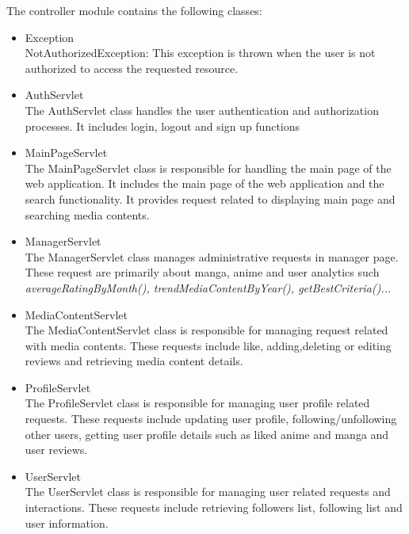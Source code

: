 The controller module contains the following classes:
\begin{itemize}
    \item Exception \\
    NotAuthorizedException: This exception is thrown when the user is not authorized to access the requested resource.
    \item AuthServlet \\
    The AuthServlet class handles the user authentication and authorization processes. It includes login, logout and sign up functions
    \item MainPageServlet \\
    The MainPageServlet class is responsible for handling the main page of the web application. It includes the main page of the web application and the search functionality.
    It provides request related to displaying main page and searching media contents.
    \item ManagerServlet \\
    The ManagerServlet class manages administrative requests in manager page. These request are primarily about manga, anime and user analytics such \textit{averageRatingByMonth(), trendMediaContentByYear(), getBestCriteria()...}
    \item MediaContentServlet \\
    The MediaContentServlet class is responsible for managing request related with media contents. These requests include like, adding,deleting or editing reviews and retrieving media content details. 
    \item ProfileServlet \\
    The ProfileServlet class is responsible for managing user profile related requests. These requests include updating user profile, following/unfollowing other users, getting user profile details such as liked anime and manga and user reviews.
    \item UserServlet \\
    The UserServlet class is responsible for managing user related requests and interactions. These requests include retrieving followers list, following list and user information. 
\end{itemize}

